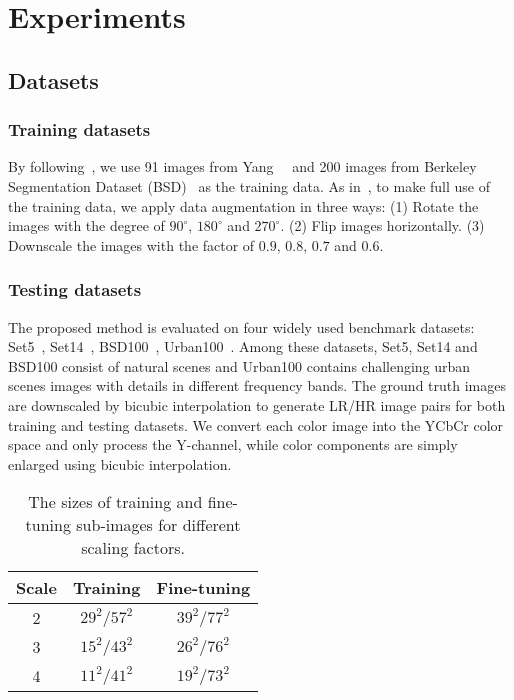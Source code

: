 \documentclass[10pt,twocolumn,letterpaper]{article}
\begin{document}
\section{Experiments}
\subsection{Datasets}
\subsubsection{Training datasets}
By following~\cite{VDSR,LapSRN,DRRN,MemNet}, we use 91 images from Yang~\etal~\cite{sparse_coding_TIP} and 200 images from Berkeley Segmentation Dataset (BSD)~\cite{BSD} as the training data. As in~\cite{DRRN}, to make full use of the training data, we apply data augmentation in three ways: (1) Rotate the images with the degree of ${90^ \circ }$, ${180^ \circ }$ and ${270^ \circ }$. (2) Flip images horizontally. (3) Downscale the images with the factor of $0.9$, $0.8$, $0.7$ and $0.6$.

\subsubsection{Testing datasets}
The proposed method is evaluated on four widely used benchmark datasets: Set5~\cite{Set5}, Set14~\cite{Set14}, BSD100~\cite{BSD}, Urban100~\cite{Urban100}. Among these datasets, Set5, Set14 and BSD100 consist of natural scenes and Urban100 contains challenging urban scenes images with details in different frequency bands. The ground truth images are downscaled by bicubic interpolation to generate LR/HR image pairs for both training and testing datasets. We convert each color image into the YCbCr color space and only process the Y-channel, while color components are simply enlarged using bicubic interpolation.
\begin{table}[htb]
	\small
	\centering
	\begin{tabular}{|c|c|c|}
		\hline
		Scale & Training & Fine-tuning \\
		\hline\hline
		2 & ${29^2}/{57^2}$ & ${39^2}/{77^2}$ \\
		3 & ${15^2}/{43^2}$ & ${26^2}/{76^2}$ \\
		4 & ${11^2}/{41^2}$ & ${19^2}/{73^2}$ \\
		\hline
	\end{tabular}
	\caption{The sizes of training and fine-tuning sub-images for different scaling factors.}
	\label{samples_setting}
\end{table}
\end{document}
